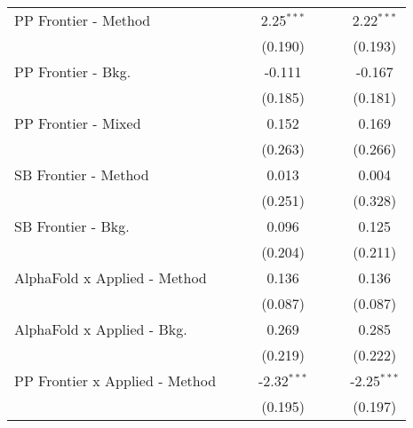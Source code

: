 \begin{tabular}{lcccccc}
   PP Frontier - Method           &                &              & 2.25$^{***}$  &                &              & 2.22$^{***}$\\   
                                  &                &              & (0.190)       &                &              & (0.193)\\   
   PP Frontier - Bkg.             &                &              & -0.111        &                &              & -0.167\\   
                                  &                &              & (0.185)       &                &              & (0.181)\\   
   PP Frontier - Mixed            &                &              & 0.152         &                &              & 0.169\\   
                                  &                &              & (0.263)       &                &              & (0.266)\\   
   SB Frontier - Method           &                &              & 0.013         &                &              & 0.004\\   
                                  &                &              & (0.251)       &                &              & (0.328)\\   
   SB Frontier - Bkg.             &                &              & 0.096         &                &              & 0.125\\   
                                  &                &              & (0.204)       &                &              & (0.211)\\   
   AlphaFold x Applied - Method   &                &              & 0.136         &                &              & 0.136\\   
                                  &                &              & (0.087)       &                &              & (0.087)\\   
   AlphaFold x Applied - Bkg.     &                &              & 0.269         &                &              & 0.285\\   
                                  &                &              & (0.219)       &                &              & (0.222)\\   
   PP Frontier x Applied - Method &                &              & -2.32$^{***}$ &                &              & -2.25$^{***}$\\   
                                  &                &              & (0.195)       &                &              & (0.197)\\   

\end{tabular}
